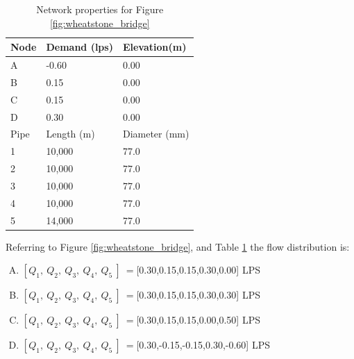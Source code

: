 \documentclass[11pt]{article}
\begin{document}
\begin{enumerate}
\begin{table}[h!]
   \centering
   \caption{Network properties for Figure \ref{fig:wheatstone_bridge}}
\begin{tabular}{lll}
\hline
Node&Demand (lps)&  Elevation(m) \\
\hline
A & -0.60 & 0.00 \\
B &  0.15   & 0.00 \\
C & 0.15 & 0.00 \\
D & 0.30 & 0.00 \\
\hline
Pipe& Length (m)&  Diameter (mm)\\
\hline
1 & 10,000 & 77.0 \\
2 & 10,000 & 77.0 \\
3 & 10,000 & 77.0 \\
4 & 10,000 & 77.0 \\
5 & 14,000 & 77.0 \\
\end{tabular}
\label{tab:wheatstone1}
\normalsize
\end{table}



Referring to Figure \ref{fig:wheatstone_bridge}, and Table \ref{tab:wheatstone1} the flow distribution is:
\begin{enumerate}[(A)]
\item $[Q_1,~Q_2,~Q_3,~Q_4,~Q_5~]~=$[0.30,0.15,0.15,0.30,0.00] LPS
\item $[Q_1,~Q_2,~Q_3,~Q_4,~Q_5~]~=$[0.30,0.15,0.15,0.30,0.30] LPS
\item $[Q_1,~Q_2,~Q_3,~Q_4,~Q_5~]~=$[0.30,0.15,0.15,0.00,0.50] LPS
\item $[Q_1,~Q_2,~Q_3,~Q_4,~Q_5~]~=$[0.30,-0.15,-0.15,0.30,-0.60] LPS
\end{enumerate}
\end{enumerate}
\end{document}
